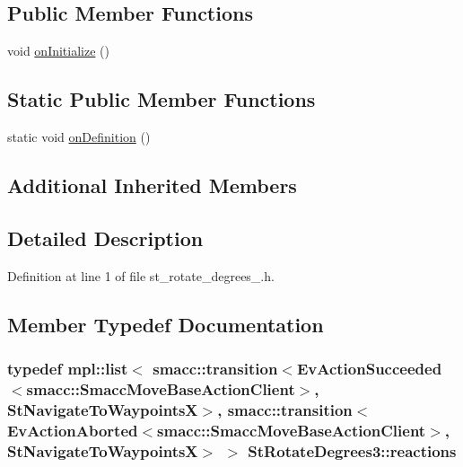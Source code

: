 \subsection*{Public Member Functions}
\begin{DoxyCompactItemize}
\item 
void \hyperlink{structStRotateDegrees3_a9a69cfa8a8193207068ae828ee0f6c97}{on\+Initialize} ()
\end{DoxyCompactItemize}
\subsection*{Static Public Member Functions}
\begin{DoxyCompactItemize}
\item 
static void \hyperlink{structStRotateDegrees3_a5b8c80e7b209c2d83ce9711d73d636e7}{on\+Definition} ()
\end{DoxyCompactItemize}
\subsection*{Additional Inherited Members}


\subsection{Detailed Description}


Definition at line 1 of file st\+\_\+rotate\+\_\+degrees\+\_.\+h.



\subsection{Member Typedef Documentation}
\subsubsection[{\texorpdfstring{reactions}{reactions}}]{\setlength{\rightskip}{0pt plus 5cm}typedef mpl\+::list$<$ {\bf smacc\+::transition}$<$Ev\+Action\+Succeeded$<${\bf smacc\+::\+Smacc\+Move\+Base\+Action\+Client}$>$, {\bf St\+Navigate\+To\+WaypointsX}$>$, {\bf smacc\+::transition}$<$Ev\+Action\+Aborted$<${\bf smacc\+::\+Smacc\+Move\+Base\+Action\+Client}$>$, {\bf St\+Navigate\+To\+WaypointsX}$>$ $>$ {\bf St\+Rotate\+Degrees3\+::reactions}}\hypertarget{structStRotateDegrees3_ae2fa4cf769a28bbc126e3e8734dac27d}{}\label{structStRotateDegrees3_ae2fa4cf769a28bbc126e3e8734dac27d}


